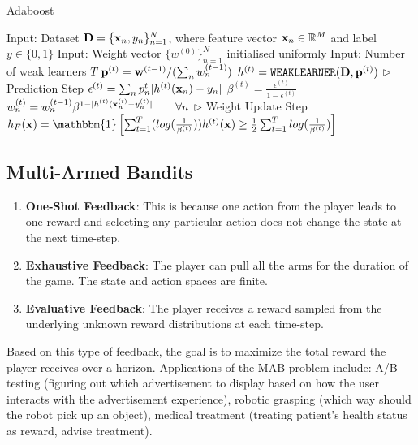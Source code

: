 \documentclass[11pt]{article}
\begin{document}
\begin{algorithm}
\caption{Adaboost}
\label{algo:adaboost}
\begin{algorithmic}[1]
\STATE Input: Dataset $\mathbf{D} =\{\mathbf{x}_n, y_n\}_{n=1}^{N}$, where feature vector $\mathbf{x}_n \in \mathbb{R}^M$ and label $y \in \{0, 1\}$
\STATE Input: Weight vector $\{w^{(0)}\}_{n=1}^{N}$ initialised uniformly
\STATE Input: Number of weak learners $T$ 
\STATE $\mathbf{p}^{(t)} = \mathbf{w}^{(t-1)}/(\sum_n w_n^{(t-1)})$ 
\STATE $h^{(t)} = \mathtt{WEAKLEARNER}(\mathbf{D}, \mathbf{p}^{(t)})$  \hfill $\triangleright$ Prediction Step
\STATE $\epsilon^{(t)} = \sum_n p^t_n |h^{(t)}(\mathbf{x}_n) - y_n|$
\STATE $\beta^{(t)} = \frac{\epsilon^{(t)}}{1-\epsilon^{(t)}}$
\STATE $w_n^{(t)} = w_n^{(t-1)}\beta^{1-|h^{(t)}(\mathbf{x}_n^{(t)}-y_n^{(t)}|} \qquad \forall n$ \hfill $\triangleright$ Weight Update Step
\ENDFOR
\STATE $h_F(\xv) = \mathbbm{1}\left[\sum_{t=1}^T (log(\frac{1}{\beta^{(t)}}))h^{(t)}(\xv) \ge \frac{1}{2} \sum_{t=1}^{T} log(\frac{1}{\beta^{(t)}})\right]$
\end{algorithmic}
\end{algorithm}

\subsection{Multi-Armed Bandits}
\begin{enumerate}
    \item \textbf{One-Shot Feedback}: This is because one action from the player leads to one
    reward and selecting any particular action does not change the state at the next time-step.
    \item \textbf{Exhaustive Feedback}: The player can pull all the arms for the duration of the
    game. The state and action spaces are finite.
    \item \textbf{Evaluative Feedback}: The player receives a reward sampled from the underlying
    unknown reward distributions at each time-step.
\end{enumerate}
Based on this type of feedback, the goal is to maximize the total reward the player receives over
a horizon. Applications of the MAB problem include: A/B testing (figuring out which advertisement to display based on how
the user interacts with the advertisement experience), robotic grasping (which way should the robot pick up
an object), medical treatment (treating patient's health status as reward, advise treatment).
\end{document}
